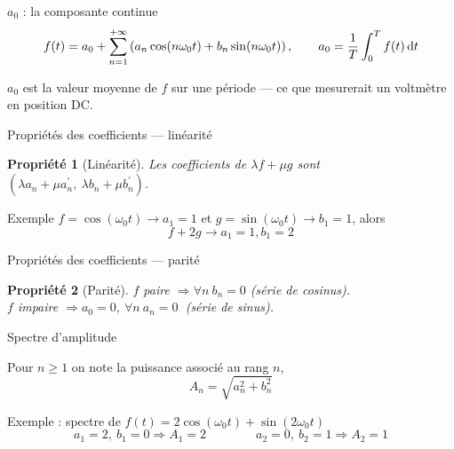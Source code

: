 \documentclass[aspectratio=43,10pt]{beamer}
\newtheorem{proposition}{Propriété}
\newcommand{\slidefig}[2]{%
\begin{center}
\resizebox{#1}{!}{}
\end{center}
}
\begin{document}
\begin{frame}{$a_0$ : la composante continue}
    \[
        f(t) = a_0 + \sum_{n=1}^{+\infty}\left(a_n\cos(n\omega_0 t)+b_n\sin(n\omega_0 t)\right),
        \qquad
        a_0 = \frac1T\int_0^T f(t)\,{\rm d} t
    \]
    \slidefig{0.6\textwidth}{dc-mean.tex}
    \begin{center}
        \small $a_0$ est la valeur moyenne de $f$ sur une période ---
        ce que mesurerait un voltmètre en position DC.
    \end{center}
\end{frame}

\begin{frame}{Propriétés des coefficients --- linéarité}
    \begin{proposition}[Linéarité]
        Les coefficients de $\lambda f + \mu g$ sont
        $(\lambda a_n+\mu a_n^\prime,\ \lambda b_n+\mu b_n^\prime)$.
    \end{proposition}
    \begin{exampleblock}{Exemple}
        $f=\cos(\omega_0 t) \to a_1=1$ et
        $g=\sin(\omega_0 t) \to b_1=1$, alors 
        $$f+2g  \to a_1=1, b_1=2$$ 
    \end{exampleblock}
\end{frame}

\begin{frame}{Propriétés des coefficients --- parité}
        \begin{proposition}[Parité]
            $f$ paire $\Rightarrow \forall n \ b_n=0$  (série de cosinus).
            \\[1em]
            $f$ impaire $\Rightarrow  a_0=0,\ \forall n \ a_n=0\ $  (série de sinus).
        \end{proposition}
        \slidefig{\textwidth}{parity-illustration.tex}
\end{frame}

\begin{frame}{Spectre d'amplitude}
    \small
    \begin{definition}
        Pour $n\geq1$ on note la puissance associé au rang $n$, $$A_n=\sqrt{a_n^2+b_n^2}$$
    \end{definition}

    Exemple : spectre de $f(t)=2\cos(\omega_0 t)+\sin(2\omega_0 t)$
    \[
        a_1=2,\ b_1=0 \Rightarrow A_1=2 \qquad\qquad
        a_2=0,\ b_2=1 \Rightarrow A_2=1
    \]
    \slidefig{0.55\textwidth}{spectre-simple-example.tex}
\end{frame}
\end{document}
